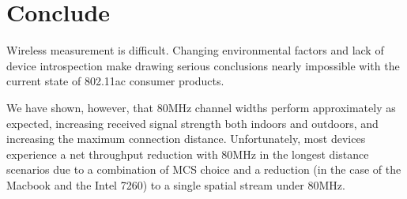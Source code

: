 \section{Conclude}
Wireless measurement is difficult. Changing environmental factors and
lack of device introspection make drawing serious conclusions nearly
impossible with the current state of 802.11ac consumer products.

We have shown, however, that 80MHz channel widths perform
approximately as expected, increasing received signal strength both
indoors and outdoors, and increasing the maximum connection distance.
Unfortunately, most devices experience a net throughput reduction with
80MHz in the longest distance scenarios due to a combination of MCS
choice and a reduction (in the case of the Macbook and the Intel 7260)
to a single spatial stream under 80MHz.


